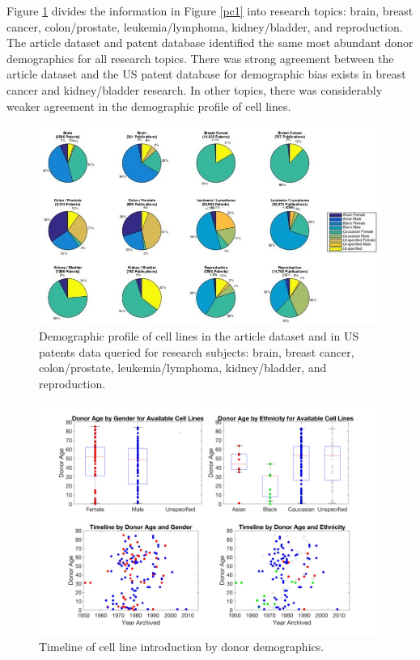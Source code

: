 \documentclass[10pt]{article}
\begin{document}
Figure \ref{pc2} divides the information in Figure \ref{pc1} into research topics: brain, breast cancer, colon/prostate, leukemia/lymphoma, kidney/bladder, and reproduction. The article dataset and patent database identified the same most abundant donor demographics for all research topics. There was strong agreement between the article dataset and the US patent database for demographic bias exists in breast cancer and kidney/bladder research. In other topics, there was considerably weaker agreement in the demographic profile of cell lines. 

\begin{figure}[h!]
\centering
\includegraphics[width=0.98\columnwidth]{Figures/PieChart_2}
\caption{\label{pc2}Demographic profile of cell lines in the article dataset and in US patents data queried for research subjects: brain, breast cancer, colon/prostate, leukemia/lymphoma, kidney/bladder, and reproduction.}
\end{figure}


\begin{figure}[h!]
\centering
\includegraphics[width=0.98\columnwidth]{Figures/TimelineDonorAge}
\caption{\label{pcbg}Timeline of cell line introduction by donor demographics. }
\end{figure}
\end{document}
